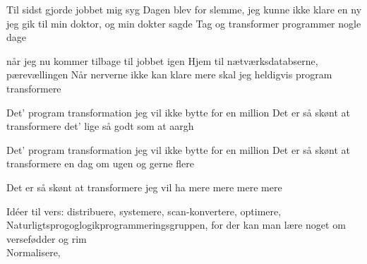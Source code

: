 \documentclass[10pt]{article}
\begin{document}
\begin{song}
Til sidst gjorde jobbet mig syg
Dagen blev for slemme, jeg kunne ikke klare en ny
jeg gik til min doktor, og min dokter sagde
Tag og transformer programmer nogle dage

når jeg nu kommer tilbage til jobbet igen
Hjem til nætværksdatabserne, pærevællingen
Når nerverne ikke kan klare mere
skal jeg heldigvis program transformere

 Det' program transformation
jeg vil ikke bytte for en million
Det er så skønt at transformere
det' lige så godt som at aargh

Det' program transformation
jeg vil ikke bytte for en million
Det er så skønt at transformere
en dag om ugen og gerne flere

Det er så skønt at transformere
jeg vil ha mere mere mere mere
\end{song}

\scene

Idéer til vers:
distribuere,
systemere,
scan-konvertere,
optimere,\\
Naturligtsprogoglogikprogrammeringsgruppen, 
         for der kan man lære noget om versefødder og rim\\
Normalisere,
\end{document}
